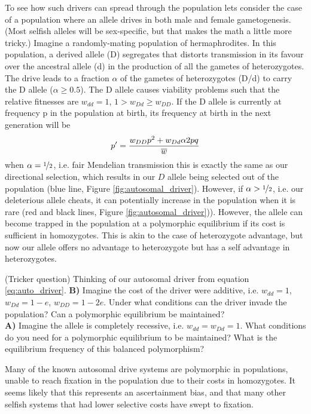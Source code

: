 {To see how such drivers can spread through the population lets
consider the case of a population where an allele drives in both male
and female gametogenesis. (Most selfish alleles will be sex-specific,
but that makes the math a little more tricky.)
Imagine a randomly-mating population of hermaphrodites. In this
population, a derived allele (D) segregates that distorts transmission
in its favour over the ancestral allele (d) in the production of all
the gametes of heterozygotes. The drive leads to a fraction $\alpha$ of the gametes
of heterozygotes (D/d) to carry the D allele ($\alpha \geq 0.5$). The D allele
causes viability problems such that the
relative fitnesses are $w_{dd}=1$, $1 > w_{Dd} \geq w_{DD}$. If the D allele
is currently at frequency p in the population at birth, its frequency
at birth in the next generation will be
\begin{equation}
p^{\prime}=\frac{w_{DD}p^2 + w_{Dd} \alpha 2pq  }{\overline{w}} \label{eq:auto_driver}
 \end{equation}
when $\alpha=\nicefrac{1}{2}$, i.e. fair Mendelian transmission this is exactly the same as our directional selection, which results in our $D$
allele being selected out of the population (blue line, Figure \ref{fig:autosomal_driver}). However, if
$\alpha>\nicefrac{1}{2}$, i.e. our deleterious allele cheats, it can potentially
increase in the population when it is rare (red and black lines,
Figure \ref{fig:autosomal_driver})). However, the allele can become
trapped in the population at a polymorphic equilibrium if its cost is
sufficient in homozygotes. This is akin to the case of heterozygote
advantage, but now our allele offers no advantage to heterozygote but
has a self advantage in heterozygotes.

\begin{question} (Tricker question)
  Thinking of our autosomal driver from equation \ref{eq:auto_driver}.
  {\bf B)}	Imagine the cost of the driver were additive, i.e.  $w_{dd}=1$, $w_{Dd}=1-e$, $w_{DD}=1-2e$. Under what conditions can the
driver invade the population? Can a polymorphic equilibrium be maintained?\\
{\bf A)}	Imagine the allele is completely recessive, i.e. $w_{dd}=w_{Dd}=1$. What conditions do you need for a polymorphic equilibrium to be maintained? What is the equilibrium frequency of this balanced polymorphism?\\
\end{question}

Many of the known autosomal drive systems are polymorphic in
populations, unable to reach fixation in the population due to their
costs in homozygotes. It seems likely that this represents an
ascertainment bias, and that many other selfish systems that had
lower selective costs have swept to
fixation. 

}
